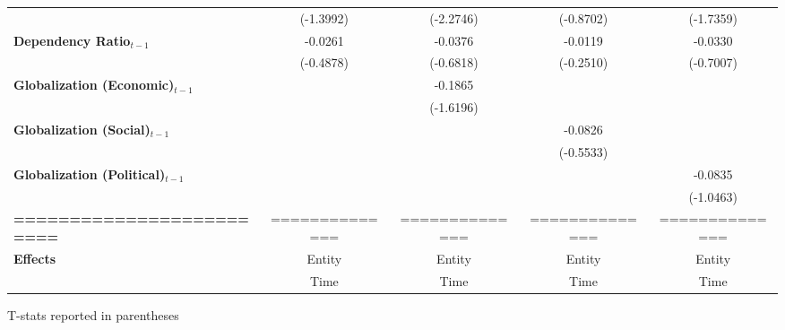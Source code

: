 \begin{center}
\begin{tabular}{lcccc}
\textbf{ }                         &   (-1.3992)    &    (-2.2746)     &    (-0.8702)     &    (-1.7359)      \\
\textbf{Dependency Ratio$_{t-1}$}   &    -0.0261     &     -0.0376      &     -0.0119      &     -0.0330       \\
\textbf{ }                         &   (-0.4878)    &    (-0.6818)     &    (-0.2510)     &    (-0.7007)      \\
\textbf{Globalization (Economic)$_{t-1}$}             &                &     -0.1865      &                  &                   \\
\textbf{ }                         &                &    (-1.6196)     &                  &                   \\
\textbf{Globalization (Social)$_{t-1}$}             &                &                  &     -0.0826      &                   \\
\textbf{ }                         &                &                  &    (-0.5533)     &                   \\
\textbf{Globalization (Political)$_{t-1}$}             &                &                  &                  &     -0.0835       \\
\textbf{ }                         &                &                  &                  &    (-1.0463)      \\
\textbf{=========================} & ============== &  ==============  &  ==============  &  ==============   \\
\textbf{Effects}                   &     Entity     &      Entity      &      Entity      &      Entity       \\
\textbf{}                          &      Time      &       Time       &       Time       &       Time        \\
\bottomrule
\end{tabular}
\end{center}

T-stats reported in parentheses